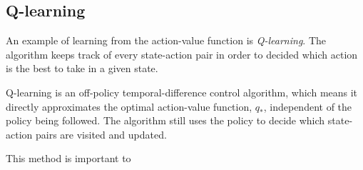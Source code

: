 \documentclass[11pt]{article}
\begin{document}
\maketitle

\subsection{Q-learning}

An example of learning from the action-value function is \textit{Q-learning}.
The algorithm keeps track of every state-action pair in order to decided which
action is the best to take in a given state.

Q-learning is an off-policy temporal-difference control algorithm, which means
it directly approximates the optimal action-value function, $q_\ast$,
independent of the policy being followed\cite{RLbook}.
The algorithm still uses the policy to decide which state-action pairs are visited
and updated.

This method is important to 

%
%
\end{document}
